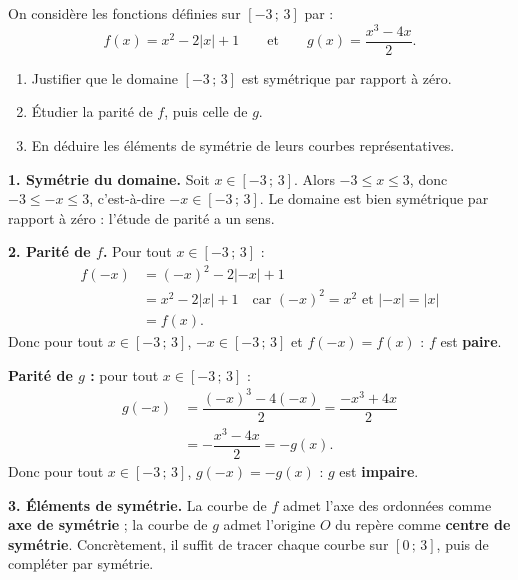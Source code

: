 \documentclass[11pt]{article}
\begin{document}
\begin{exoresolu}
On considère les fonctions définies sur $[-3\,;\,3]$ par :
\[ f(x)=x^2-2|x|+1 \qquad \text{et} \qquad g(x)=\dfrac{x^3-4x}{2}. \]
\begin{enumerate}
\item Justifier que le domaine $[-3\,;\,3]$ est symétrique par rapport à zéro.
\item Étudier la parité de $f$, puis celle de $g$.
\item En déduire les éléments de symétrie de leurs courbes représentatives.
\end{enumerate}
\tcblower
\textbf{1. Symétrie du domaine.} Soit $x\in[-3\,;\,3]$. Alors $-3\le x\le 3$, donc $-3\le -x\le 3$, c'est-à-dire $-x\in[-3\,;\,3]$. Le domaine est bien symétrique par rapport à zéro : l'étude de parité a un sens.

\textbf{2. Parité de $f$.} Pour tout $x\in[-3\,;\,3]$ :
\begin{align*}
f(-x) &= (-x)^2-2|-x|+1 \\
&= x^2-2|x|+1 \quad \text{car } (-x)^2=x^2 \text{ et } |-x|=|x|\\
&= f(x).
\end{align*}
Donc pour tout $x\in[-3\,;\,3]$, $-x\in[-3\,;\,3]$ et $f(-x)=f(x)$ : $f$ est \textbf{paire}.

\textbf{Parité de $g$ :} pour tout $x\in[-3\,;\,3]$ :
\begin{align*}
g(-x) &= \dfrac{(-x)^3-4(-x)}{2} = \dfrac{-x^3+4x}{2} \\
&= -\dfrac{x^3-4x}{2} = -g(x).
\end{align*}
Donc pour tout $x\in[-3\,;\,3]$, $g(-x)=-g(x)$ : $g$ est \textbf{impaire}.

\textbf{3. Éléments de symétrie.} La courbe de $f$ admet l'axe des ordonnées comme \textbf{axe de symétrie} ; la courbe de $g$ admet l'origine $O$ du repère comme \textbf{centre de symétrie}. Concrètement, il suffit de tracer chaque courbe sur $[0\,;\,3]$, puis de compléter par symétrie.
\end{exoresolu}
\end{document}

